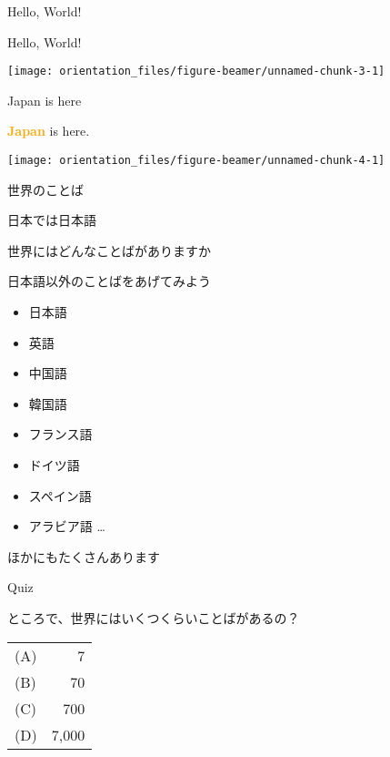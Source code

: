 \documentclass[
  ignorenonframetext,
  aspectratio=169,
  xcolor=dvipsnames]{beamer}
\providecommand{\tightlist}{%
  \setlength{\itemsep}{0pt}\setlength{\parskip}{0pt}}
\begin{document}
\begin{frame}{Hello, World!}
\label{hello-world}
\Large

Hello, World!

\texttt{[image: orientation\_files/figure-beamer/unnamed-chunk-3-1]}
\end{frame}

\begin{frame}{Japan is here}
\label{japan-is-here}
\Large

\textcolor{orange}{\bfseries Japan} is here.

\texttt{[image: orientation\_files/figure-beamer/unnamed-chunk-4-1]}
\end{frame}

\begin{frame}{世界のことば}
\label{ux4e16ux754cux306eux3053ux3068ux3070}
\Large

日本では日本語

\pause

世界にはどんなことばがありますか
\end{frame}

\begin{frame}{日本語以外のことばをあげてみよう}
\label{ux65e5ux672cux8a9eux4ee5ux5916ux306eux3053ux3068ux3070ux3092ux3042ux3052ux3066ux307fux3088ux3046}
\Large

\begin{itemize}[<+->]
\tightlist
\item
  日本語
\item
  英語
\item
  中国語
\item
  韓国語
\item
  フランス語
\item
  ドイツ語
\item
  スペイン語
\item
  アラビア語 \ldots
\end{itemize}

\pause

ほかにもたくさんあります
\end{frame}

\begin{frame}{Quiz}
\label{quiz}
\Large

ところで、世界にはいくつくらいことばがあるの？

\pause

\vfill

\centering
\begin{tabular}{lr}
(A) &7\\\pause
(B) &70\\\pause
(C) &700\\\pause
(D) &7,000
\end{tabular}

\vfill
\end{frame}
\end{document}
